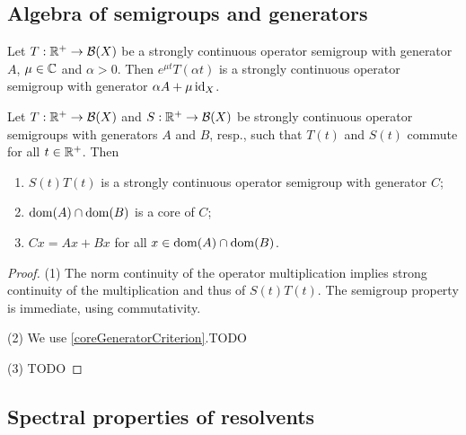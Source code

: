 \subsection{Algebra of semigroups and generators}
\begin{proposition}
Let $T: \mathbb{R}^+\to \operatorname{\mathcal{B}}(X)$ be a strongly continuous operator semigroup with generator $A$, $\mu\in\mathbb{C}$ and $\alpha >0$. Then $e^{\mu t}T(\alpha t)$ is a strongly continuous operator semigroup with generator $\alpha A + \mu\operatorname{id}_X$.
\end{proposition}

\begin{proposition} \label{productSemigroup}
Let $T: \mathbb{R}^+\to \operatorname{\mathcal{B}}(X)$ and $S: \mathbb{R}^+\to \operatorname{\mathcal{B}}(X)$ be strongly continuous operator semigroups with generators $A$ and $B$, resp., such that $T(t)$ and $S(t)$ commute for all $t\in \mathbb{R}^+$. Then
\begin{enumerate}
\item $S(t)T(t)$ is a strongly continuous operator semigroup with generator $C$;
\item $\operatorname{dom}(A)\cap \operatorname{dom}(B)$ is a core of $C$;
\item $Cx = Ax + Bx$ for all $x\in \operatorname{dom}(A)\cap \operatorname{dom}(B)$.
\end{enumerate}
\end{proposition}
\begin{proof}
(1) The norm continuity of the operator multiplication implies strong continuity of the multiplication and thus of $S(t)T(t)$. The semigroup property is immediate, using commutativity.

(2) We use \ref{coreGeneratorCriterion}.TODO

(3) TODO
\end{proof}

\subsection{Spectral properties of resolvents}

